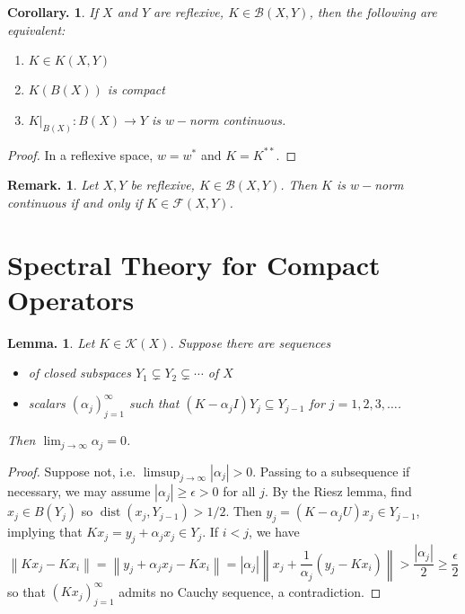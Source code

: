 \documentclass[11pt, a4paper]{memoir}
\newcommand{\norm}[1]{\ensuremath{\left\lVert#1\right\rVert}}
\theoremstyle{change}
\newtheorem{lemma}[theorem]{Lemma.}
\newtheorem{corollary}[theorem]{Corollary.}
\theoremstyle{plain}
\theoremstyle{nonumberplain}
\newtheorem{remark}{Remark.}
\newtheorem{proof}{Proof}
\DeclareMathOperator{\dist}{dist}
\numberwithin{equation}{section}
\begin{document}
\begin{corollary}
    If $X$ and $Y$ are reflexive, $K\in\mathcal{B}(X,Y)$, then the following are equivalent:
    \begin{enumerate}[nl,r]
        \item $K\in K(X,Y)$
        \item $K(B(X))$ is compact
        \item $K|_{B(X)}:B(X)\to Y$ is $w-$norm continuous.
    \end{enumerate}
\end{corollary}
\begin{proof}
    In a reflexive space, $w=w^*$ and $K=K^{**}$.
\end{proof}
\begin{remark}
    Let $X,Y$ be reflexive, $K\in\mathcal{B}(X,Y)$.
    Then $K$ is $w-$norm continuous if and only if $K\in\mathcal{F}(X,Y)$.
\end{remark}

\section{Spectral Theory for Compact Operators}
\begin{lemma}
    Let $K\in\mathcal{K}(X)$.
    Suppose there are sequences
    \begin{itemize}[nl]
        \item of closed subspaces $Y_1\subsetneq Y_2\subsetneq\cdots$ of $X$
        \item scalars $(\alpha_j)_{j=1}^\infty$ such that $(K-\alpha_jI)Y_j\subseteq Y_{j-1}$ for $j=1,2,3,\ldots$.
    \end{itemize}
    Then $\lim_{j\to\infty}\alpha_j=0$.
\end{lemma}
\begin{proof}
    Suppose not, i.e. $\limsup_{j\to\infty}|\alpha_j|>0$.
    Passing to a subsequence if necessary, we may assume $|\alpha_j|\geq\epsilon>0$ for all $j$.
    By the Riesz lemma, find $x_j\in B(Y_j)$ so $\dist(x_j,Y_{j-1})>1/2$.
    Then $y_j=(K-\alpha_jU)x_j\in Y_{j-1}$, implying that $Kx_j=y_j+\alpha_jx_j\in Y_j$.
    If $i<j$, we have
    \begin{equation*}
        \norm{Kx_j-Kx_i}=\norm{y_j+\alpha_jx_j-Kx_i}=|\alpha_j|\norm{x_j+\frac{1}{\alpha_j}(y_j-Kx_i)}>\frac{|\alpha_j|}{2}\geq\frac{\epsilon}{2}
    \end{equation*}
    so that $(Kx_j)_{j=1}^\infty$ admits no Cauchy sequence, a contradiction.
\end{proof}
\end{document}
